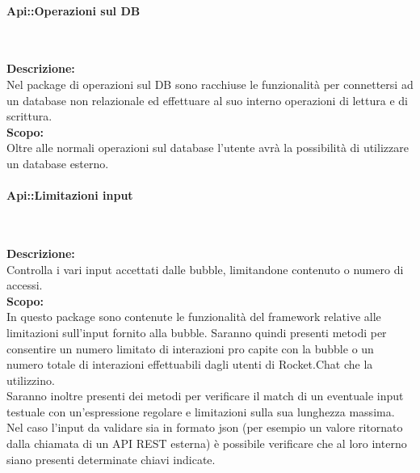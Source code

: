 \begin{samepage}
\paragraph{Api::Operazioni sul DB}\label{api-db}\mbox{}\\
\end{samepage}
\textbf{Descrizione:}\\
Nel package di operazioni sul DB sono racchiuse le funzionalità per connettersi ad un database non relazionale ed effettuare al suo interno operazioni di lettura e di scrittura.\\
\textbf{Scopo:}\\
Oltre alle normali operazioni sul database l’utente avrà la possibilità di utilizzare un database esterno.

\begin{samepage}
\paragraph{Api::Limitazioni input}\label{api-limiti}\mbox{}\\
\end{samepage}
\textbf{Descrizione:}\\
Controlla i vari input accettati dalle bubble, limitandone contenuto o numero di accessi.\\
\textbf{Scopo:}\\
In questo package sono contenute le funzionalità del framework relative alle limitazioni sull’input fornito alla bubble. Saranno quindi presenti metodi per consentire un numero limitato di interazioni pro capite con la bubble o un numero totale di interazioni effettuabili dagli utenti di Rocket.Chat che la utilizzino.\\
Saranno inoltre presenti dei metodi per verificare il match di un eventuale input testuale con un'espressione regolare e limitazioni sulla sua lunghezza massima. Nel caso l'input da validare sia in formato json (per esempio un valore ritornato dalla chiamata di un API REST esterna) è possibile verificare che al loro interno siano presenti determinate chiavi indicate.

